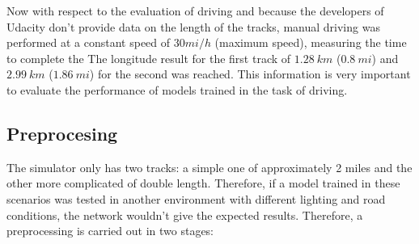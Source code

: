 \documentclass[conference]{IEEEtran}
\begin{document}
Now with respect to the evaluation of driving and because the developers of Udacity don't provide data on the length of the tracks, manual driving was performed at a constant speed of $30 mi/h$ (maximum speed), measuring the time to complete the The longitude result for the first track of $1.28\ km$ ($0.8\ mi$) and $2.99\ km$ ($1.86\ mi$) for the second was reached. This information is very important to evaluate the performance of models trained in the task of driving.

\subsection{Preprocesing}

The simulator only has two tracks: a simple one of approximately 2 miles and the other more complicated of double length. Therefore, if a model trained in these scenarios was tested in another environment with different lighting and road conditions, the network wouldn't give the expected results. Therefore, a preprocessing is carried out in two stages:
\end{document}
